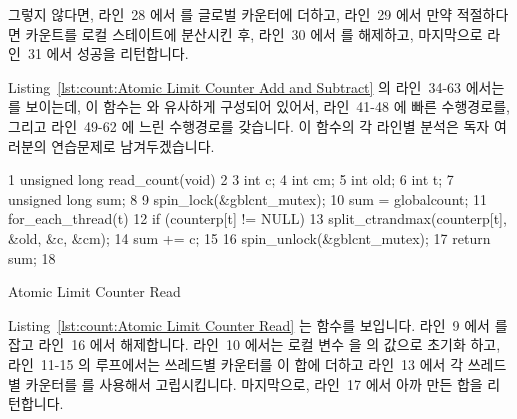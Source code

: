 그렇지 않다면, 라인~28 에서  를 글로벌 카운터에 더하고, 라인~29 에서
만약 적절하다면 카운트를 로컬 스테이트에 분산시킨 후, 라인~30 에서
 를 해제하고, 마지막으로 라인~31 에서 성공을 리턴합니다.

Listing~\ref{lst:count:Atomic Limit Counter Add and Subtract} 의 라인~34-63
에서는  를 보이는데, 이 함수는  와 유사하게
구성되어 있어서, 라인~41-48 에 빠른 수행경로를, 그리고 라인~49-62 에 느린
수행경로를 갖습니다.
이 함수의 각 라인별 분석은 독자 여러분의 연습문제로 남겨두겠습니다.

\begin{listing}[tbp]
{ \scriptsize
\begin{verbbox}
  1 unsigned long read_count(void)
  2 {
  3   int c;
  4   int cm;
  5   int old;
  6   int t;
  7   unsigned long sum;
  8 
  9   spin_lock(&gblcnt_mutex);
 10   sum = globalcount;
 11   for_each_thread(t)
 12     if (counterp[t] != NULL) {
 13       split_ctrandmax(counterp[t], &old, &c, &cm);
 14       sum += c;
 15     }
 16   spin_unlock(&gblcnt_mutex);
 17   return sum;
 18 }
\end{verbbox}
}
\centering
\theverbbox
\caption{Atomic Limit Counter Read}
\label{lst:count:Atomic Limit Counter Read}
\end{listing}

Listing~\ref{lst:count:Atomic Limit Counter Read} 는  함수를
보입니다.
라인~9 에서  를 잡고 라인~16 에서 해제합니다.
라인~10 에서는 로컬 변수  을  의 값으로 초기화 하고,
라인~11-15 의 루프에서는 쓰레드별 카운터를 이 합에 더하고 라인~13 에서 각
쓰레드별 카운터를  를 사용해서 고립시킵니다.
마지막으로, 라인~17 에서 아까 만든 합을 리턴합니다.

